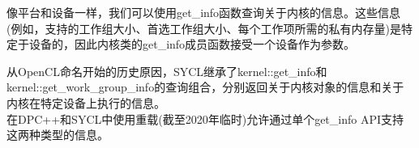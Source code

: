 像平台和设备一样，我们可以使用get\_info函数查询关于内核的信息。这些信息(例如，支持的工作组大小、首选工作组大小、每个工作项所需的私有内存量)是特定于设备的，因此内核类的get\_info成员函数接受一个设备作为参数。\par

\begin{tcolorbox}[colback=blue!5!white,colframe=blue!75!black, title=SYCL 1.2.1中的设备有关内核的特定信息]
从OpenCL命名开始的历史原因，SYCL继承了kernel::get\_info和kernel::get\_work\_group\_info的查询组合，分别返回关于内核对象的信息和关于内核在特定设备上执行的信息。\\

在DPC++和SYCL中使用重载(截至2020年临时)允许通过单个get\_info API支持这两种类型的信息。
\end{tcolorbox}




































